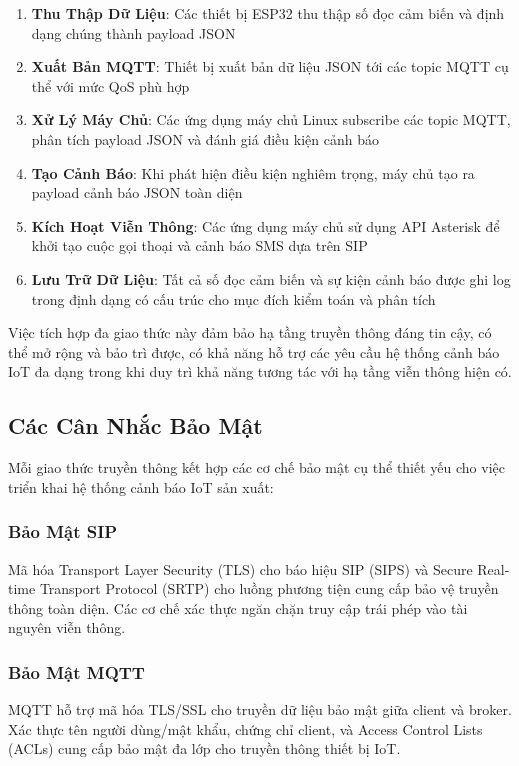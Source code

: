 \begin{enumerate}
    \item \textbf{Thu Thập Dữ Liệu}: Các thiết bị ESP32 thu thập số đọc cảm biến và định dạng chúng thành payload JSON
    \item \textbf{Xuất Bản MQTT}: Thiết bị xuất bản dữ liệu JSON tới các topic MQTT cụ thể với mức QoS phù hợp
    \item \textbf{Xử Lý Máy Chủ}: Các ứng dụng máy chủ Linux subscribe các topic MQTT, phân tích payload JSON và đánh giá điều kiện cảnh báo
    \item \textbf{Tạo Cảnh Báo}: Khi phát hiện điều kiện nghiêm trọng, máy chủ tạo ra payload cảnh báo JSON toàn diện
    \item \textbf{Kích Hoạt Viễn Thông}: Các ứng dụng máy chủ sử dụng API Asterisk để khởi tạo cuộc gọi thoại và cảnh báo SMS dựa trên SIP
    \item \textbf{Lưu Trữ Dữ Liệu}: Tất cả số đọc cảm biến và sự kiện cảnh báo được ghi log trong định dạng có cấu trúc cho mục đích kiểm toán và phân tích
\end{enumerate}

Việc tích hợp đa giao thức này đảm bảo hạ tầng truyền thông đáng tin cậy, có thể mở rộng và bảo trì được, có khả năng hỗ trợ các yêu cầu hệ thống cảnh báo IoT đa dạng trong khi duy trì khả năng tương tác với hạ tầng viễn thông hiện có.

\subsection{Các Cân Nhắc Bảo Mật}
\label{subsec:protocol_security}

Mỗi giao thức truyền thông kết hợp các cơ chế bảo mật cụ thể thiết yếu cho việc triển khai hệ thống cảnh báo IoT sản xuất:

\subsubsection{Bảo Mật SIP}
Mã hóa Transport Layer Security (TLS) cho báo hiệu SIP (SIPS) và Secure Real-time Transport Protocol (SRTP) cho luồng phương tiện cung cấp bảo vệ truyền thông toàn diện. Các cơ chế xác thực ngăn chặn truy cập trái phép vào tài nguyên viễn thông.

\subsubsection{Bảo Mật MQTT}
MQTT hỗ trợ mã hóa TLS/SSL cho truyền dữ liệu bảo mật giữa client và broker. Xác thực tên người dùng/mật khẩu, chứng chỉ client, và Access Control Lists (ACLs) cung cấp bảo mật đa lớp cho truyền thông thiết bị IoT.

